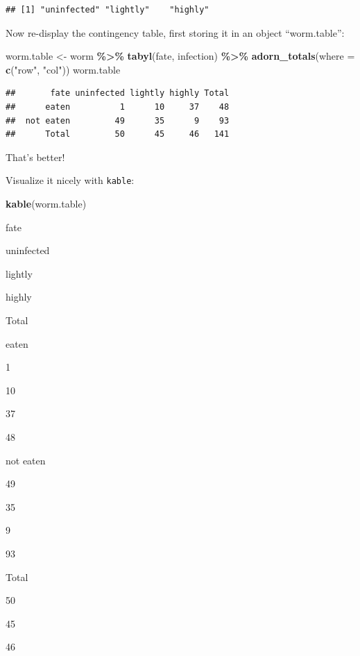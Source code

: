 \documentclass[
]{book}
\newenvironment{Shaded}{\begin{snugshade}}{\end{snugshade}}
\newcommand{\AttributeTok}[1]{\textcolor[rgb]{0.13,0.29,0.53}{#1}}
\newcommand{\FunctionTok}[1]{\textcolor[rgb]{0.13,0.29,0.53}{\textbf{#1}}}
\newcommand{\NormalTok}[1]{#1}
\newcommand{\OtherTok}[1]{\textcolor[rgb]{0.56,0.35,0.01}{#1}}
\newcommand{\SpecialCharTok}[1]{\textcolor[rgb]{0.81,0.36,0.00}{\textbf{#1}}}
\newcommand{\StringTok}[1]{\textcolor[rgb]{0.31,0.60,0.02}{#1}}
\begin{document}
\begin{verbatim}
## [1] "uninfected" "lightly"    "highly"
\end{verbatim}

Now re-display the contingency table, first storing it in an object ``worm.table'':

\begin{Shaded}
\begin{Highlighting}[]
\NormalTok{worm.table }\OtherTok{\textless{}{-}}\NormalTok{ worm }\SpecialCharTok{\%\textgreater{}\%}
  \FunctionTok{tabyl}\NormalTok{(fate, infection) }\SpecialCharTok{\%\textgreater{}\%}
  \FunctionTok{adorn\_totals}\NormalTok{(}\AttributeTok{where =} \FunctionTok{c}\NormalTok{(}\StringTok{"row"}\NormalTok{, }\StringTok{"col"}\NormalTok{))}
\NormalTok{worm.table}
\end{Highlighting}
\end{Shaded}

\begin{verbatim}
##       fate uninfected lightly highly Total
##      eaten          1      10     37    48
##  not eaten         49      35      9    93
##      Total         50      45     46   141
\end{verbatim}

That's better!

Visualize it nicely with \texttt{kable}:

\begin{Shaded}
\begin{Highlighting}[]
\FunctionTok{kable}\NormalTok{(worm.table)}
\end{Highlighting}
\end{Shaded}

fate

uninfected

lightly

highly

Total

eaten

1

10

37

48

not eaten

49

35

9

93

Total

50

45

46
\end{document}
